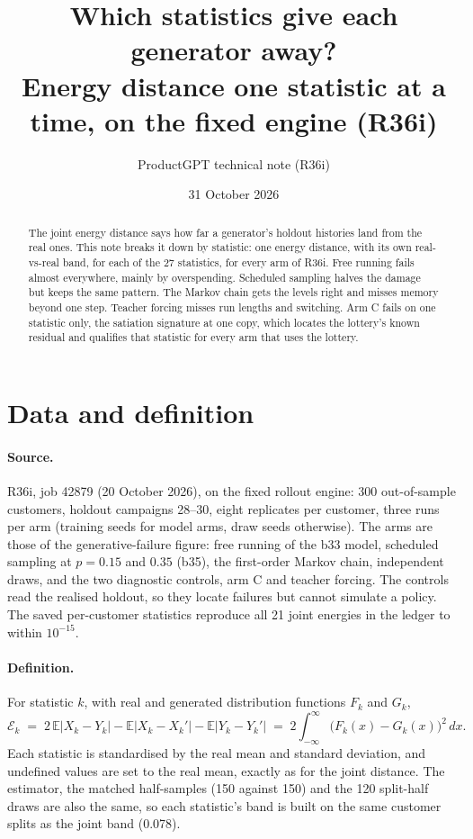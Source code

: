 \documentclass[11pt]{article}
\title{\textbf{Which statistics give each generator away?}\\[2pt]
\large Energy distance one statistic at a time, on the fixed engine (R36i)}
\author{ProductGPT technical note (R36i)}
\date{31 October 2026}
\newcommand{\E}{\mathbb{E}}
\begin{document}
\maketitle

\begin{abstract}
\noindent The joint energy distance says how far a generator's holdout
histories land from the real ones. This note breaks it down by statistic: one
energy distance, with its own real-vs-real band, for each of the 27 statistics,
for every arm of R36i. Free running fails almost everywhere, mainly by
overspending. Scheduled sampling halves the damage but keeps the same pattern.
The Markov chain gets the levels right and misses memory beyond one step.
Teacher forcing misses run lengths and switching. Arm C fails on one statistic
only, the satiation signature at one copy, which locates the lottery's known
residual and qualifies that statistic for every arm that uses the lottery.
\end{abstract}

\section{Data and definition}

\paragraph{Source.} R36i, job 42879 (20 October 2026), on the fixed rollout
engine: 300 out-of-sample customers, holdout campaigns 28--30, eight replicates
per customer, three runs per arm (training seeds for model arms, draw seeds
otherwise). The arms are those of the generative-failure figure: free running
of the b33 model, scheduled sampling at $p = 0.15$ and $0.35$ (b35), the
first-order Markov chain, independent draws, and the two diagnostic controls,
arm C and teacher forcing. The controls read the realised holdout, so they
locate failures but cannot simulate a policy. The saved per-customer statistics
reproduce all 21 joint energies in the ledger to within $10^{-15}$.

\paragraph{Definition.} For statistic $k$, with real and generated distribution
functions $F_k$ and $G_k$,
\begin{equation}
\mathcal{E}_k \;=\; 2\,\E|X_k - Y_k| - \E|X_k - X_k'| - \E|Y_k - Y_k'|
\;=\; 2\int_{-\infty}^{\infty}\big(F_k(x) - G_k(x)\big)^2\,dx .
\end{equation}
Each statistic is standardised by the real mean and standard deviation, and
undefined values are set to the real mean, exactly as for the joint distance.
The estimator, the matched half-samples (150 against 150) and the 120
split-half draws are also the same, so each statistic's band is built on the
same customer splits as the joint band (0.078).
\end{document}
